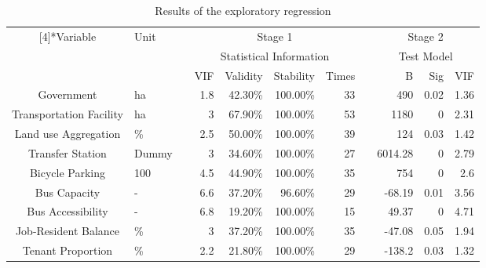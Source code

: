 \begin{sidewaystable}[htbp]
	\centering
	\caption{Results of the exploratory regression}
	\label{tab:chp2:ExploratoryRegression}%
	\small
	\renewcommand{\arraystretch}{1.25} %
	\begin{tabular}{clrrrrrcrrr}
		\Xhline{1.5pt}
		
		\multirow{3}[4]{*}{Variable} & \multirow{3}[4]{*}{Unit} & & \multicolumn{4}{c}{Stage 1} & & \multicolumn{3}{c}{Stage 2} \\
		
		& & & \multicolumn{4}{c}{Statistical Information} & & \multicolumn{3}{c}{Test Model} \\
		
		\cmidrule{4-7} \cmidrule{9-11}
		
		& & & VIF & Validity & Stability & Times & & B & Sig & VIF \\
		
		\cmidrule{1-2}\cmidrule{4-7}\cmidrule{9-11}
		
		Government & ha & & 1.8 & 42.30\% & 100.00\% & 33 & & 490 & 0.02  & 1.36 \\
		Transportation Facility & ha & & 3 & 67.90\% & 100.00\% & 53 & & 1180 & 0 & 2.31 \\
		
		Land use Aggregation & \% & & 2.5 & 50.00\% & 100.00\% & 39 & & 124 & 0.03 & 1.42 \\
		
		Transfer Station & Dummy & & 3 & 34.60\% & 100.00\% & 27 & & 6014.28 & 0 & 2.79 \\
		
		Bicycle Parking & 100 & & 4.5 & 44.90\% & 100.00\% & 35 & & 754 & 0 & 2.6 \\
		
		Bus Capacity & - & & 6.6 & 37.20\% & 96.60\% & 29 & & -68.19 & 0.01 & 3.56 \\
		
		Bus Accessibility & - & & 6.8 & 19.20\% & 100.00\% & 15 & & 49.37 & 0 & 4.71 \\
		
		Job-Resident Balance & \% & & 3 & 37.20\% & 100.00\% & 35 & & -47.08 & 0.05  & 1.94 \\
		
		Tenant Proportion & \% & & 2.2 & 21.80\% & 100.00\% & 29 & & -138.2 & 0.03  & 1.32 \\
		

\end{tabular}
\end{sidewaystable}
